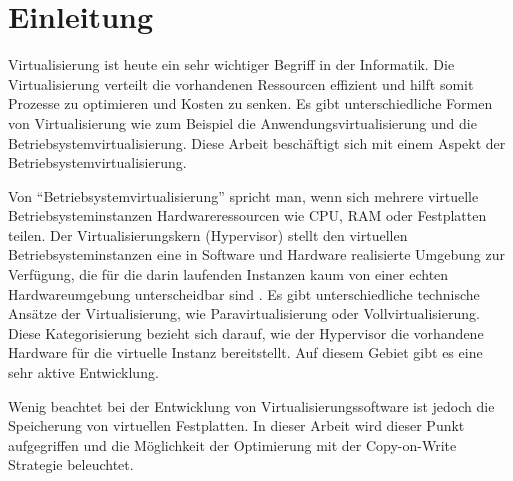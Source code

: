 \chapter{Einleitung}
Virtualisierung ist heute ein sehr wichtiger Begriff in der Informatik. Die Virtualisierung verteilt die vorhandenen Ressourcen effizient und hilft somit Prozesse zu optimieren und Kosten zu senken. Es gibt unterschiedliche Formen von Virtualisierung wie zum Beispiel die Anwendungsvirtualisierung und die Betriebsystemvirtualisierung. Diese Arbeit beschäftigt sich mit einem Aspekt der Betriebsystemvirtualisierung.

Von ``Betriebsystemvirtualisierung'' spricht man, wenn sich mehrere virtuelle Betriebsysteminstanzen Hardwareressourcen wie CPU, RAM oder Festplatten teilen. Der Virtualisierungskern (Hypervisor) stellt den virtuellen Betriebsysteminstanzen eine in Software und Hardware realisierte Umgebung zur Verfügung, die für die darin laufenden Instanzen kaum von einer echten Hardwareumgebung unterscheidbar sind  \cite{andrep} \cite{baun}. Es gibt unterschiedliche technische Ansätze der Virtualisierung, wie Paravirtualisierung oder Vollvirtualisierung. Diese Kategorisierung bezieht sich darauf, wie der Hypervisor die vorhandene Hardware für die virtuelle Instanz bereitstellt. Auf diesem Gebiet gibt es eine sehr aktive Entwicklung.

Wenig beachtet bei der Entwicklung von Virtualisierungssoftware ist jedoch die Speicherung von virtuellen Festplatten. In dieser Arbeit wird dieser Punkt aufgegriffen und die Möglichkeit der Optimierung mit der Copy-on-Write Strategie beleuchtet.


